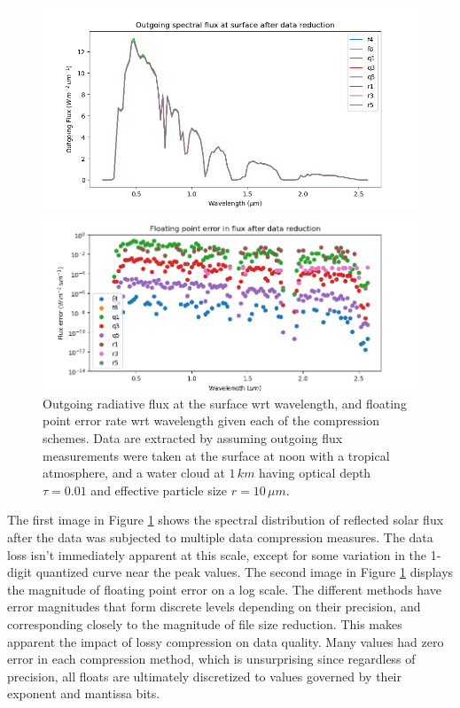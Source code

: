 \documentclass[11pt]{article}
\begin{document}
\begin{figure}[h!]
    \centering
    \includegraphics[width=.75\paperwidth]{figs/sflux.png}

    \includegraphics[width=.75\paperwidth]{figs/error2.png}
    \caption{Outgoing radiative flux at the surface wrt wavelength, and floating point error rate wrt wavelength given each of the compression schemes. Data are extracted by assuming outgoing flux measurements were taken at the surface at noon with a tropical atmosphere, and a water cloud at $1\,\si{km}$ having optical depth $\tau=0.01$ and effective particle size $r=10\,\si{\mu m}$.}
    \label{sflux}
\end{figure}

The first image in Figure \ref{sflux} shows the spectral distribution of reflected solar flux after the data was subjected to multiple data compression measures. The data loss isn't immediately apparent at this scale, except for some variation in the 1-digit quantized curve near the peak values. The second image in Figure \ref{sflux} displays the magnitude of floating point error on a log scale. The different methods have error magnitudes that form discrete levels depending on their precision, and corresponding closely to the magnitude of file size reduction. This makes apparent the impact of lossy compression on data quality. Many values had zero error in each compression method, which is unsurprising since regardless of precision, all floats are ultimately discretized to values governed by their exponent and mantissa bits.
\end{document}
